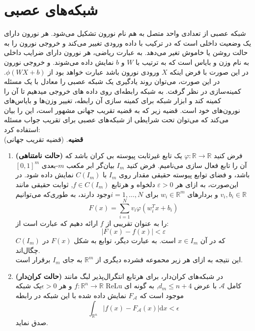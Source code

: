 \section*{شبکه‌های عصبی }
شبکه عصبی از تعدادی واحد متصل به هم نام نورون تشکیل می‌شود. هر نورون دارای یک وضعیت داخلی است که در ترکیب با داده ورودی تغییر می‌کند و خروجی نورون را به حالت روشن یا خاموش تغیر می‌دهد. به عبارت ریاضی، هر نورون دارای ضرایب داخلی به نام وزن و بایاس است که به ترتیب با $W$ و $b$ نمایش داده می‌شوند. و خروجی نورون در این صورت با فرض اینکه $X$ ورودی نورون باشد عبارت خواهد بود از $\phi(WX + b)$. در این صورت، می‌توان روند یادگیری یک شبکه عصبی را معادل با یک مسئله کمینه‌سازی در نظر گرفت. به شبکه رابطه‌ای روی داده های خروجی میدهیم تا آن را کمینه کند و ابزار شبکه برای کمینه سازی آن رابطه، تغییر وزن‌ها و بایاس‌های نورون‌های خود است. قضیه زیر که به قضیه تقریب جهانی مشهور است، این را بیان می‌کند که می‌توان تحت شرایطی از شبکه‌های عصبی برای تقریب جواب مسئله استفاده کرد:\\
\textbf{قضیه}. (قضیه تقریب جهانی) \\
	\begin{enumerate}
	\item \textbf{(حالت نامتناهی)} فرض کنید $\varphi :\mathbb {R} \to \mathbb {R}$ یک تابع غیرثابت پیوسته بی کران باشد که آن را تابع فعال سازی می‌نامیم. فرض کنید $I_{m}$ بیان‌گر ابر مکعب $m$-بعدی $[0,1]^{m}$ باشد، و فضای توابع پیوسته حقیقی مقدار روی $I_m$ با $C(I_{m})$ نمایش داده شود. در این‌صورت، به ازای هر $\varepsilon > 0$ دلخواه و هرتابع  $f\in C(I_{m})$, ثوابت حقیقی مانند  $v_{i},b_{i}\in \mathbb  {R}$ و بردارهای $w_{i}\in \mathbb {R} ^{m}$ برای $i=1,\dots ,N$وجود دارند، به طوری‌که می‌توانیم  	
	\begin{equation*}
	F(x)=\sum _{{i=1}}^{{N}}v_{i}\varphi \left(w_{i}^{T}x+b_{i}\right)
	\end{equation*}
	را به عنوان تقریبی از $f$ ارائه دهیم که عبارت است از:
	\begin{equation*}
	|F(x) - f (x)|  < \varepsilon
	\end{equation*}
	که در آن $x\in I_{m}$ است. به عبارت دیگر، توابع به شکل $F(x)$ در $C(I_{m})$ چگال‌اند.\\
	این نتیجه به ازای هر زیر محموعه فشرده دیگری از $\mathbb {R} ^{m}$ به جای  $I_m$ برقرار است.
	\item \textbf{(حالت کران‌دار)} در شبکه‌های کران‌دار، برای هرتابع انتگرال‌پذیر لبگ مانند  $f:\mathbb {R} ^{n}\rightarrow \mathbb {R}$ و هر $\epsilon >0$یک شبکه ReLu کامل $\mathcal {A}$ با عرض $ d_{m}\leq {n+4}$, به گونه ای موجود است که $F_{\mathcal {A}}$ نمایش داده شده با این شبکه در رابطه
	\begin{equation*}
	\int _{\mathbb {R} ^{n}}\left|f(x)-F_{\mathcal {A}}(x)\right|\mathrm {d} x<\epsilon
	\end{equation*}
	صدق ‌نماید.
\end{enumerate}
\clearpage
\newpage
